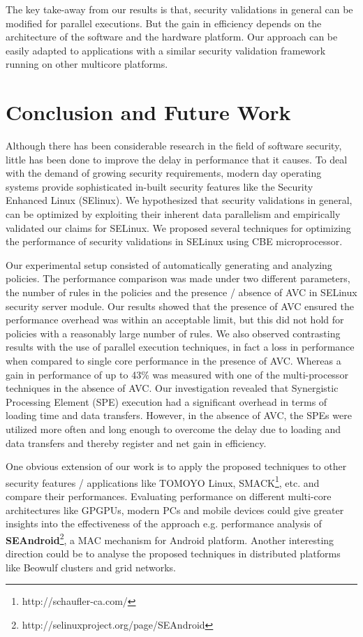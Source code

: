 \documentclass[conference]{IEEEtran}
\begin{document}
The key take-away from our results is that, security
validations in general can be modified for parallel executions. But
the gain in efficiency depends on the architecture of the software and
the hardware platform. Our approach can be easily adapted to applications with a similar security validation framework running on other multicore platforms.

\section{Conclusion and Future Work}\label{conclusion}

Although there has been considerable research in the field of software
security, little has been done to improve the delay in
performance that it causes. To deal with the demand of growing
security requirements, modern day operating systems provide
sophisticated in-built security features like the Security Enhanced
Linux (SElinux). We hypothesized that security validations in general,
can be optimized by exploiting their inherent data parallelism and
empirically validated our claims for SELinux. We proposed several
techniques for optimizing the performance of security validations in
SELinux using CBE microprocessor.

Our experimental setup consisted of automatically generating and
analyzing policies. The performance comparison was made under two
different parameters, the number of rules in the policies and the
presence / absence of AVC in SELinux security server module. Our
results showed that the presence of AVC ensured the performance
overhead was within an acceptable limit, but this did not hold for
policies with a reasonably large number of rules. We also observed
contrasting results with the use of parallel execution techniques, in
fact a loss in performance when compared to single core performance in
the presence of AVC. Whereas a gain in performance of up to 43\% was
measured with one of the multi-processor techniques in the absence of
AVC. Our investigation revealed that Synergistic Processing Element
(SPE) execution had a significant overhead in terms of loading time
and data transfers. However, in the absence of AVC, the SPEs were
utilized more often and long enough to overcome the delay due to
loading and data transfers and thereby register and net gain in
efficiency.

One obvious extension of our work is to apply the proposed techniques
to other security features / applications like TOMOYO Linux, SMACK\footnote{http://schaufler-ca.com/}, etc. and compare their performances. Evaluating performance on different
multi-core architectures like GPGPUs, modern PCs and mobile devices
could give greater insights into the effectiveness of the approach
e.g. performance analysis of
\textbf{SEAndroid}\footnote{http://selinuxproject.org/page/SEAndroid},
a MAC mechanism for Android platform.  Another interesting direction could be to analyse
 the proposed techniques in distributed platforms like Beowulf
 clusters and grid networks.




\end{document}
